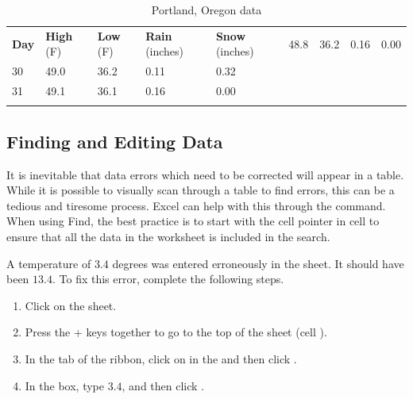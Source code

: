 \begin{table}[H]
	{\small
		\begin{longtable}{L{0.50in}L{0.50in}L{0.50in}L{0.50in}L{0.50in}} %
			\textbf{Day} & \textbf{High} (\textdegree F) & \textbf{Low} (\textdegree F) & \textbf{Rain} (inches) & \textbf{Snow} (inches) \endhead
			 & 48.8 & 36.2 & 0.16 & 0.00 \\ 
			30 & 49.0 & 36.2 & 0.11 & 0.32 \\ 
			31 & 49.1 & 36.1 & 0.16 & 0.00 \\ 
			\caption{Portland, Oregon data}
			\label{05:tab03}
		\end{longtable}
	} %
\end{table}

\subsection{Finding and Editing Data}

It is inevitable that data errors which need to be corrected will appear in a table. While it is possible to visually scan through a table to find errors, this can be a tedious and tiresome process. Excel can help with this through the  command. When using Find, the best practice is to start with the cell pointer in cell  to ensure that all the data in the worksheet is included in the search.

A temperature of $ 3.4 $ degrees was entered erroneously in the  sheet. It should have been $ 13.4 $. To fix this error, complete the following steps.

\begin{enumerate}
	\item Click on the  sheet.
	\item Press the + keys together to go to the top of the sheet (cell ).
	\item In the  tab of the ribbon, click on  in the  and then click .
	\item In the  box, type $ 3.4 $, and then click .
\end{enumerate}

